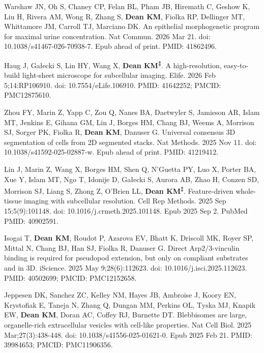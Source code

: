 \begin{etaremune}

\item Warshaw JN, Oh S, Chaney CP, Felan BL, Pham JB, Hiremath C, Geshow K, Liu H, Rivera AM, Wong R, Zhang S, \textbf{Dean KM}, Fiolka RP, Dellinger MT, Whittamore JM, Carroll TJ, Marciano DK. An epithelial morphogenetic program for maximal urine concentration. Nat Commun. 2026 Mar 21. doi: 10.1038/s41467-026-70938-7. Epub ahead of print. PMID: 41862496.

\item Haug J, Ga{\l}ecki S, Lin HY, Wang X, \textbf{Dean KM\textsuperscript{‡}}. A high-resolution, easy-to-build light-sheet microscope for subcellular imaging. Elife. 2026 Feb 5;14:RP106910. doi: 10.7554/eLife.106910. PMID: 41642252; PMCID: PMC12875610.

\item Zhou FY, Marin Z, Yapp C, Zou Q, Nanes BA, Daetwyler S, Jamieson AR, Islam MT, Jenkins E, Gihana GM, Lin J, Borges HM, Chang BJ, Weems A, Morrison SJ, Sorger PK, Fiolka R, \textbf{Dean KM}, Danuser G. Universal consensus 3D segmentation of cells from 2D segmented stacks. Nat Methods. 2025 Nov 11. doi: 10.1038/s41592-025-02887-w. Epub ahead of print. PMID: 41219412.

\item Lin J, Marin Z, Wang X, Borges HM, Shen Q, N'Guetta PY, Luo X, Porter BA, Xue Y, Islam MT, Ngo T, Idonije D, Ga{\l}ecki S, Aurora AB, Zhao H, Conzen SD, Morrison SJ, Liang S, Zhong Z, O'Brien LL, \textbf{Dean KM\textsuperscript{‡}}. Feature-driven whole-tissue imaging with subcellular resolution. Cell Rep Methods. 2025 Sep 15;5(9):101148. doi: 10.1016/j.crmeth.2025.101148. Epub 2025 Sep 2. PubMed PMID: 40902591.

\item Isogai T, \textbf{Dean KM}, Roudot P, Azarova EV, Bhatt K, Driscoll MK, Royer SP, Mittal N, Chang BJ, Han SJ, Fiolka R, Danuser G. Direct Arp2/3-vinculin binding is required for pseudopod extension, but only on compliant substrates and in 3D. iScience. 2025 May 9;28(6):112623. doi: 10.1016/j.isci.2025.112623. PMID: 40502699; PMCID: PMC12152658.

\item Jeppesen DK, Sanchez ZC, Kelley NM, Hayes JB, Ambroise J, Koory EN, Krystofiak E, Taneja N, Zhang Q, Dungan MM, Perkins OL, Tyska MJ, Knapik EW, \textbf{Dean KM}, Doran AC, Coffey RJ, Burnette DT. Blebbisomes are large, organelle-rich extracellular vesicles with cell-like properties. Nat Cell Biol. 2025 Mar;27(3):438-448. doi: 10.1038/s41556-025-01621-0. Epub 2025 Feb 21. PMID: 39984653; PMCID: PMC11906356.


\end{etaremune}
